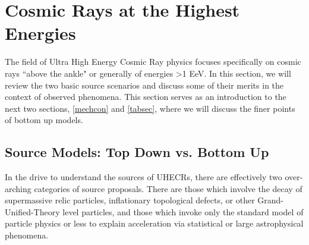 %


\section{Cosmic Rays at the Highest Energies}
The field of Ultra High Energy Cosmic Ray physics focuses specifically on cosmic rays ``above the ankle" or generally of energies \textgreater 1 EeV. In this section, we will review the two basic source scenarios and discuss some of their merits in the context of observed phenomena. This section serves as an introduction to the next two sections, \autoref{mechcon} and \autoref{tabsec}, where we will discuss the finer points of bottom up models.



\subsection{Source Models: Top Down vs. Bottom Up}%
In the drive to understand the sources of UHECRs, there are effectively two over-arching categories of source proposals. There are those which involve the decay of supermassive relic particles, inflationary topological defects, or other Grand-Unified-Theory level particles, and those which invoke only the standard model of particle physics or less to explain acceleration via statistical or large astrophysical phenomena. 
